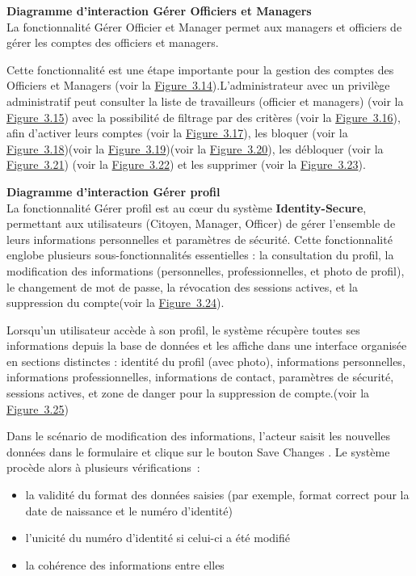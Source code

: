 \medskip

\noindent\textbf{\textendash{} Diagramme d'interaction \og Gérer Officiers et Managers\fg{}}\\
\hspace{1em}La fonctionnalité \og Gérer Officier et Manager \fg{} permet aux managers et officiers de gérer les comptes des officiers et managers.

\hspace{1em}Cette fonctionnalité est une étape importante pour la gestion des comptes des Officiers et Managers (voir la \hyperref[fig:3.14]{Figure~3.14}).L'administrateur avec un privilège administratif peut consulter la liste de travailleurs (officier et managers) (voir la \hyperref[fig:3.15]{Figure~3.15}) avec la possibilité de filtrage par des critères (voir la \hyperref[fig:3.16]{Figure~3.16}), afin d'activer leurs comptes (voir la \hyperref[fig:3.17]{Figure~3.17}), les bloquer (voir la \hyperref[fig:3.18]{Figure~3.18})(voir la \hyperref[fig:3.19]{Figure~3.19})(voir la \hyperref[fig:3.20]{Figure~3.20}), les débloquer (voir la \hyperref[fig:3.21]{Figure~3.21}) (voir la \hyperref[fig:3.22]{Figure~3.22}) et les supprimer (voir la \hyperref[fig:3.23]{Figure~3.23}).
\medskip

\noindent\textbf{\textendash{} Diagramme d'interaction \og Gérer profil \fg{}}\\
\hspace{1em}La fonctionnalité \og Gérer profil \fg{} est au cœur du système \textbf{Identity-Secure}, permettant aux utilisateurs (Citoyen, Manager, Officer) de gérer l'ensemble de leurs informations personnelles et paramètres de sécurité. Cette fonctionnalité englobe plusieurs sous-fonctionnalités essentielles : la consultation du profil, la modification des informations (personnelles, professionnelles, et photo de profil), le changement de mot de passe, la révocation des sessions actives, et la suppression du compte(voir la \hyperref[fig:3.24]{Figure~3.24}).

\hspace{1em}Lorsqu'un utilisateur accède à son profil, le système récupère toutes ses informations depuis la base de données et les affiche dans une interface organisée en sections distinctes : identité du profil (avec photo), informations personnelles, informations professionnelles, informations de contact, paramètres de sécurité, sessions actives, et zone de danger pour la suppression de compte.(voir la \hyperref[fig:3.25]{Figure~3.25})

\hspace{1em}Dans le scénario de modification des informations, l'acteur saisit les nouvelles données dans le formulaire et clique sur le bouton \og Save Changes \fg{}. Le système procède alors à plusieurs vérifications~:
\begin{itemize}
    \item la validité du format des données saisies (par exemple, format correct pour la date de naissance et le numéro d'identité)
    \item l'unicité du numéro d'identité si celui-ci a été modifié
    \item la cohérence des informations entre elles
\end{itemize}

